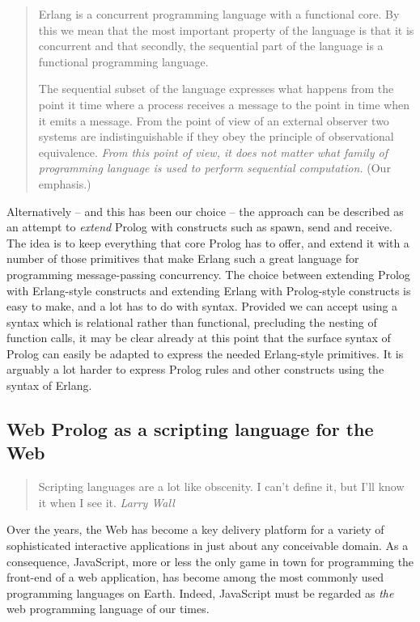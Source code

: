 \begin{quotation}
\noindent Erlang is a concurrent programming language with a functional core. By this we mean that the most important property of the language is that it is concurrent and that secondly, the sequential part of the language is a functional programming language.

The sequential subset of the language expresses what happens from the point it time where a process receives a message to the point in time when it emits a message. From the point of view of an external observer two systems are indistinguishable if they obey the principle of observational equivalence. \textit{From this point of view, it does not matter what family of programming language is used to perform sequential computation.} (Our emphasis.)
\end{quotation}

\noindent Alternatively -- and this has been our choice -- the approach can be described as an attempt to \textit{extend} Prolog with constructs such as spawn, send and receive. The idea is to keep everything that core Prolog has to offer, and extend it with a number of those primitives that make Erlang such a great language for programming message-passing concurrency. The choice between extending Prolog with Erlang-style constructs and extending Erlang with Prolog-style constructs is easy to make, and a lot has to do with syntax.
Provided we can accept using a syntax which is relational rather than functional, precluding the nesting of function calls, it may be clear already at this point that the surface syntax of Prolog can easily be adapted to express the needed Erlang-style primitives. It is arguably a lot harder to express Prolog rules and other constructs using the syntax of Erlang.

\subsection{Web Prolog as a scripting language for the Web}\label{sec:web-prolog-as-a-scripting-language}

\begin{quotation}
\noindent Scripting languages are a lot like obscenity. I can't define it, but I'll know it when I see it.
\flushright\textit{Larry Wall}
\vspace{0.3cm}
\end{quotation}

\noindent Over the years, the Web has become a key delivery platform for a variety of sophisticated interactive applications in just about any conceivable domain. As a consequence, JavaScript, more or less the only game in town for programming the front-end of a web application, has become among the most commonly used programming languages on Earth. 
Indeed, JavaScript must be regarded as \textit{the} web programming language of our times. 

